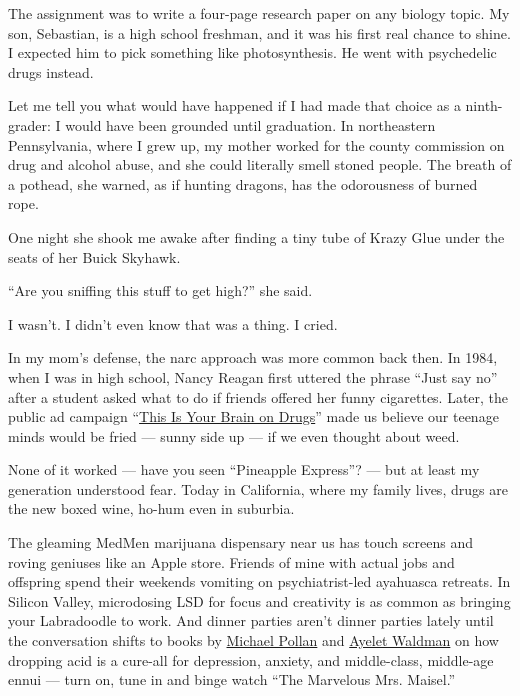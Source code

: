 The assignment was to write a four-page research paper on any biology
topic. My son, Sebastian, is a high school freshman, and it was his
first real chance to shine. I expected him to pick something like
photosynthesis. He went with psychedelic drugs instead.

Let me tell you what would have happened if I had made that choice as a
ninth-grader: I would have been grounded until graduation. In
northeastern Pennsylvania, where I grew up, my mother worked for the
county commission on drug and alcohol abuse, and she could literally
smell stoned people. The breath of a pothead, she warned, as if hunting
dragons, has the odorousness of burned rope.

One night she shook me awake after finding a tiny tube of Krazy Glue
under the seats of her Buick Skyhawk.

``Are you sniffing this stuff to get high?'' she said.

I wasn't. I didn't even know that was a thing. I cried.

In my mom's defense, the narc approach was more common back then. In
1984, when I was in high school, Nancy Reagan first uttered the phrase
``Just say no'' after a student asked what to do if friends offered her
funny cigarettes. Later, the public ad campaign
``\href{https://www.youtube.com/watch?v=3FtNm9CgA6U}{This Is Your Brain
on Drugs}'' made us believe our teenage minds would be fried --- sunny
side up --- if we even thought about weed.

None of it worked --- have you seen ``Pineapple Express''? --- but at
least my generation understood fear. Today in California, where my
family lives, drugs are the new boxed wine, ho-hum even in suburbia.

The gleaming MedMen marijuana dispensary near us has touch screens and
roving geniuses like an Apple store. Friends of mine with actual jobs
and offspring spend their weekends vomiting on psychiatrist-led
ayahuasca retreats. In Silicon Valley, microdosing LSD for focus and
creativity is as common as bringing your Labradoodle to work. And dinner
parties aren't dinner parties lately until the conversation shifts to
books by
\href{https://www.nytimes3xbfgragh.onion/2018/12/24/books/review/psychedelics-how-to-change-your-mind.html}{Michael
Pollan} and
\href{https://www.nytimes3xbfgragh.onion/2017/01/07/style/microdosing-lsd-ayelet-waldman-michael-chabon-marriage.html}{Ayelet
Waldman} on how dropping acid is a cure-all for depression, anxiety, and
middle-class, middle-age ennui --- turn on, tune in and binge watch
``The Marvelous Mrs. Maisel.''

